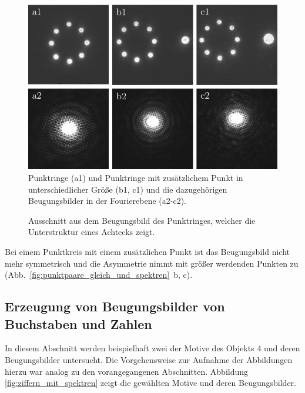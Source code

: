 \begin{figure}[h]
	\centering
	\includegraphics{images/Regina/abb17.pdf}
	\caption[Punktringe mit Fourierspektren]{
		Punktringe (a1) und Punktringe mit zusätzlichem Punkt in unterschiedlicher Größe (b1, c1) und die dazugehörigen Beugungsbilder in der Fourierebene (a2-c2).
	}
	\label{fig:punktringe_und_spektrum}
\end{figure}

\begin{figure}[h]
	\centering
	\caption[Beugungsbild der Punktringe mit Unterstruktur]{
		Ausschnitt aus dem Beugungsbild des Punktringes, welcher die Unterstruktur eines Achtecks zeigt.
	}
	\label{fig:punktringe_ausschnitt}
\end{figure}

Bei einem Punktkreis mit einem zusätzlichen Punkt ist das Beugungsbild nicht mehr symmetrisch und die Asymmetrie nimmt mit größer werdenden Punkten zu (Abb.~\ref{fig:punktpaare_gleich_und_spektren}~b, c).


\subsection{Erzeugung von Beugungsbilder von Buchstaben und Zahlen}

In diesem Abschnitt werden beispielhaft zwei der Motive des Objekts 4 und deren Beugungsbilder untersucht. Die Vorgehensweise zur Aufnahme der Abbildungen hierzu war analog zu den vorangegangenen Abschnitten. Abbildung \ref{fig:ziffern_mit_spektren} zeigt die gewählten Motive und deren Beugungsbilder. 

